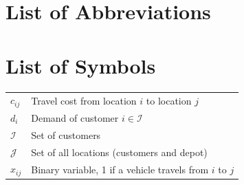 \documentclass[11pt,a4paper]{article}
\begin{document}
\section*{List of Abbreviations}
\begin{acronym}[VRP]
\end{acronym}

\newpage
{}
\section*{List of Symbols}
\begin{tabular}{p{} p{}}
	$c_{ij}$ & Travel cost from location $i$ to location $j$\\
	$d_i$ & Demand of customer $i \in \mathcal{I}$\\
	$\mathcal{I}$ & Set of customers\\
	$\mathcal{J}$ & Set of all locations (customers and depot)\\
	$x_{ij}$ & Binary variable, 1 if a vehicle travels from $i$ to $j$
\end{tabular}

\newpage
{}
\end{document}
